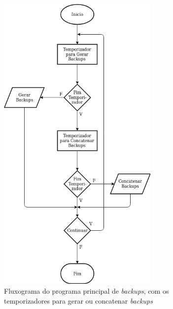\documentclass[11pt,twoside,a4paper]{report}
\begin{document}
\begin{figure}
	\begin{center}
		\includegraphics[width=0.7\textwidth]{fluxograma_backups_programa01} %
		\caption[Fluxograma do programa principal de \textit{backups}]{Fluxograma do programa principal de \textit{backups}, com os temporizadores para gerar ou concatenar \textit{backups}}
		\label{fig:backups_programa}
	\end{center}
\end{figure}
\end{document}
